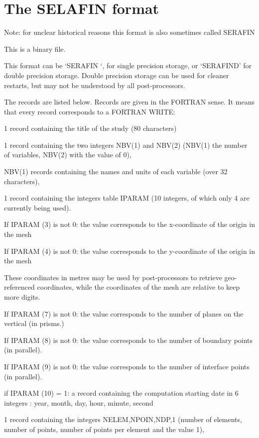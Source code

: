 \chapter{The SELAFIN format}\label{sec:srffmt}

Note: for unclear historical reasons this format is also sometimes called SERAFIN

This is a binary file.

This format can be `SERAFIN `, for single precision storage, or `SERAFIND' for
double precision storage.  Double precision storage can be used for cleaner
restarts, but may not be understood by all post-processors.


The records are listed below. Records are given in the FORTRAN sense. It means
that every record corresponds to a FORTRAN WRITE:

1 record containing the title of the study (80 characters)

1 record containing the two integers NBV(1) and
NBV(2) (NBV(1) the number of variables, NBV(2)
with the value of 0),

NBV(1) records containing the names and units of each variable (over 32
characters),

1 record containing the integers table IPARAM (10 integers, of which only 4 are
currently being used).

If IPARAM (3) is not 0: the value corresponds to the x-coordinate of the origin
in the mesh

If IPARAM (4) is not 0: the value corresponds to the y-coordinate of the origin
in the mesh

These coordinates in metres may be used by post-processors to retrieve
geo-referenced coordinates, while the coordinates of the mesh are relative to
keep more digits.

If IPARAM (7) is not 0: the value corresponds to the number of planes on the
vertical (in prisms.)

If IPARAM (8) is not 0: the value corresponds to the number of boundary points
(in parallel).

If IPARAM (9) is not 0: the value corresponds to the number of interface points
(in parallel).

if IPARAM (10) = 1: a record containing the computation starting date in 6
integers : year, month, day, hour, minute, second

1 record containing the integers NELEM,NPOIN,NDP,1 (number of elements, number
of points, number of points per element and the value 1),

